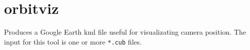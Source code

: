 
\section{orbitviz}
\label{orbitviz}

Produces a Google Earth kml file useful for visualizating camera
position. The input for this tool is one or more \verb#*.cub# files.


